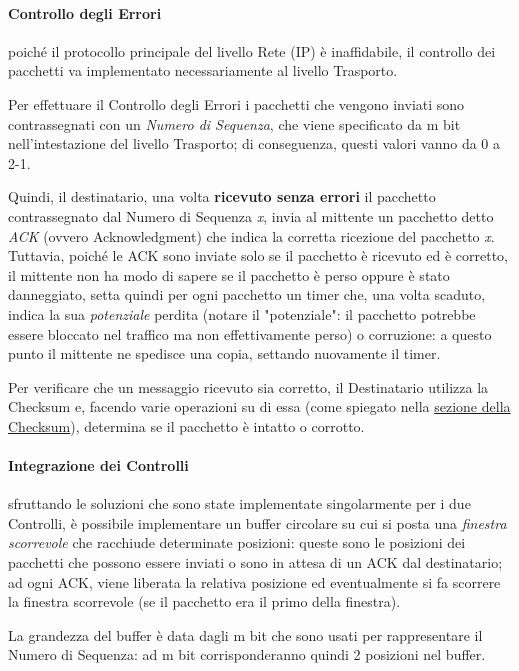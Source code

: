 \documentclass[a4paper]{article}
\begin{document}
				\paragraph{Controllo degli Errori}
					poiché il protocollo principale del livello Rete (IP) è inaffidabile, il controllo dei pacchetti va implementato necessariamente al livello Trasporto. 
					
					Per effettuare il Controllo degli Errori i pacchetti che vengono inviati sono contrassegnati con un \emph{Numero di Sequenza}, che viene specificato da m bit nell'intestazione del livello Trasporto; di conseguenza, questi valori vanno da 0 a 2-1.
					
					Quindi, il destinatario, una volta \textbf{ricevuto senza errori} il pacchetto contrassegnato dal Numero di Sequenza \emph{x}, invia al mittente un pacchetto detto \emph{ACK} (ovvero Acknowledgment) che indica la corretta ricezione del pacchetto \emph{x}.
					Tuttavia, poiché le ACK sono inviate solo se il pacchetto è ricevuto ed è corretto, il mittente non ha modo di sapere se il pacchetto è perso oppure è stato danneggiato, setta quindi per ogni pacchetto un timer che, una volta scaduto, indica la sua \emph{potenziale} perdita (notare il "potenziale": il pacchetto potrebbe essere bloccato nel traffico ma non effettivamente perso) o corruzione: a questo punto il mittente ne spedisce una copia, settando nuovamente il timer.
					
					Per verificare che un messaggio ricevuto sia corretto, il Destinatario utilizza la Checksum e, facendo varie operazioni su di essa (come spiegato nella \hyperref[sec:checksum]{sezione della Checksum}), determina se il pacchetto è intatto o corrotto.
				
				\paragraph{Integrazione dei Controlli}
					sfruttando le soluzioni che sono state implementate singolarmente per i due Controlli, è possibile implementare un buffer circolare su cui si posta una \emph{finestra scorrevole} che racchiude determinate posizioni: queste sono le posizioni dei pacchetti che possono essere inviati o sono in attesa di un ACK dal destinatario; ad ogni ACK, viene liberata la relativa posizione ed eventualmente si fa scorrere la finestra scorrevole (se il pacchetto era il primo della finestra).
					
					
					La grandezza del buffer è data dagli m bit che sono usati per rappresentare il Numero di Sequenza: ad m bit corrisponderanno quindi 2 posizioni nel buffer.	
					
\end{document}
